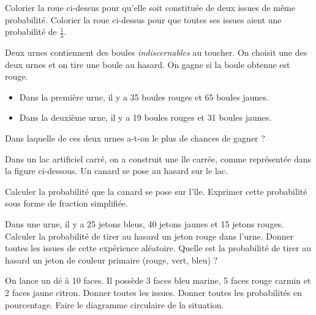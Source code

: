 \documentclass["../Cours.tex"]{subfiles}
\begin{document}
\begin{questions}
    \exercice
    \begin{center}
    \end{center}

    \question Colorier la roue ci-dessus pour qu'elle soit constituée de deux issues de même probabilité.
    \question Colorier la roue ci-dessus pour que toutes ses issues aient une probabilité de $\frac{1}{3}$.

    \clearpage
    \exercice Deux urnes contiennent des boules \emph{indiscernables} au toucher. On choisit une des deux urnes et on tire une boule au hasard. On gagne si la boule obtenue est rouge.
    \begin{itemize}
        \item Dans la première urne, il y a 35 boules rouges et 65 boules jaunes.
        \item Dans la deuxième urne, il y a 19 boules rouges et 31 boules jaunes.
    \end{itemize}
    \question Dans laquelle de ces deux urnes a-t-on le plus de chances de gagner ?

    \exercice Dans un lac artificiel carré, on a construit une île carrée, comme représentée dans la figure ci-dessous. Un canard se pose au hasard sur le lac.

    \begin{center}
    \end{center}

    \question Calculer la probabilité que la canard se pose sur l'île.
    \question Exprimer cette probabilité sous forme de fraction simplifiée.

    \exercice Dans une urne, il y a 25 jetons bleus, 40 jetons jaunes et 15 jetons rouges. 
    \question Calculer la probabilité de tirer au hasard un jeton rouge dans l'urne.
    \question Donner toutes les issues de cette expérience aléatoire.
    \question Quelle est la probabilité de tirer au hasard un jeton de couleur primaire (rouge, vert, bleu) ? 

    \exercice On lance un dé à 10 faces. Il possède 3 faces bleu marine, 5 faces rouge carmin et 2 faces jaune citron.
    \question Donner toutes les issues.
    \question Donner toutes les probabilités en pourcentage.
    \question Faire le diagramme circulaire de la situation.
\end{questions}
\end{document}
